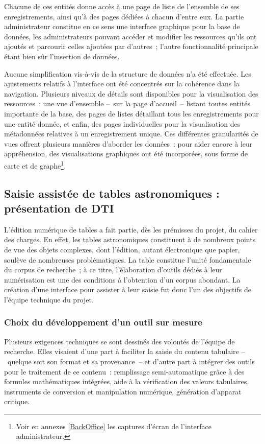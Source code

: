 \documentclass[a4paper,12pt,twoside]{book}
\begin{document}
Chacune de ces entités donne accès à une page de liste de l'ensemble de ses enregistrements, ainsi qu'à des pages dédiées à chacun d'entre eux. La partie administrateur constitue en ce sens une interface graphique pour la base de données, les administrateurs pouvant accéder et modifier les ressources qu'ils ont ajoutés et parcourir celles ajoutées par d'autres~; l'autre fonctionnalité principale étant bien sûr l'insertion de données.

Aucune simplification vis-à-vis de la structure de données n'a été effectuée. Les ajustements relatifs à l'interface ont été concentrés sur la cohérence dans la navigation. Plusieurs niveaux de détails sont disponibles pour la visualisation des ressources~: une vue d'ensemble –~sur la page d'accueil~– listant toutes entités importante de la base, des pages de listes détaillant tous les enregistrements pour une entité donnée, et enfin, des pages individuelles pour la visualisation des métadonnées relatives à un enregistrement unique. Ces différentes granularités de vues offrent plusieurs manières d'aborder les données~: pour aider encore à leur appréhension, des visualisations graphiques ont été incorporées, sous forme de carte et de graphe\footnote{Voir en annexes \ref{BackOffice}\xspace les captures d'écran de l'interface administrateur.}.

		\subsection{\label{DTI}Saisie assistée de tables astronomiques : présentation de DTI}
L'édition numérique de tables a fait partie, dès les prémisses du projet, du cahier des charges. En effet, les tables astronomiques constituent à de nombreux points de vue des objets complexes, dont l'édition, autant électronique que papier, soulève de nombreuses problématiques. La table constitue l'unité fondamentale du corpus de recherche~; à ce titre, l'élaboration d'outils dédiés à leur numérisation est une des conditions à l'obtention d'un corpus abondant. La création d'une interface pour assister à leur saisie fut donc l'un des objectifs de l'équipe technique du projet.

			\subsubsection{Choix du développement d'un outil sur mesure}
Plusieurs exigences techniques se sont dessinés des volontés de l'équipe de recherche. Elles visaient d'une part à faciliter la saisie du contenu tabulaire –~quelque soit son format et sa provenance~– et d'autre part à intégrer des outils pour le traitement de ce contenu~: remplissage semi-automatique grâce à des formules mathématiques intégrées, aide à la vérification des valeurs tabulaires, instruments de conversion et manipulation numérique, génération d'apparat critique.
\end{document}
